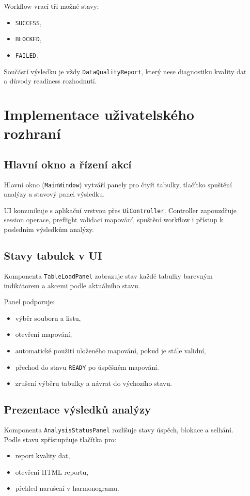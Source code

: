 \documentclass[czech, kiv, ba, he, iso690alph, pdf]{fasthesis}
\begin{document}
			Workflow vrací tři možné stavy:
			\begin{itemize}
				\item \texttt{SUCCESS},
				\item \texttt{BLOCKED},
				\item \texttt{FAILED}.
			\end{itemize}
	
			Součástí výsledku je vždy \texttt{DataQualityReport}, který nese diagnostiku kvality dat a důvody readiness rozhodnutí.
	
		\section{Implementace uživatelského rozhraní}
	
			\subsection{Hlavní okno a řízení akcí}
				Hlavní okno (\texttt{MainWindow}) vytváří panely pro čtyři tabulky, tlačítko spuštění analýzy a stavový panel výsledku.
	
				UI komunikuje s aplikační vrstvou přes \texttt{UiController}. Controller zapouzdřuje session operace, preflight validaci mapování, spuštění workflow i přístup k posledním výsledkům analýzy.
	
			\subsection{Stavy tabulek v UI}
				Komponenta \texttt{TableLoadPanel} zobrazuje stav každé tabulky barevným indikátorem a akcemi podle aktuálního stavu.
	
				Panel podporuje:
				\begin{itemize}
					\item výběr souboru a listu,
					\item otevření mapování,
					\item automatické použití uloženého mapování, pokud je stále validní,
					\item přechod do stavu \texttt{READY} po úspěšném mapování.
					\item zrušení výběru tabulky a návrat do výchozího stavu.
			\end{itemize}
	
			\subsection{Prezentace výsledků analýzy}
				Komponenta \texttt{AnalysisStatusPanel} rozlišuje stavy úspěch, blokace a selhání. Podle stavu zpřístupňuje tlačítka pro:
				\begin{itemize}
					\item report kvality dat,
					\item otevření HTML reportu,
					\item přehled narušení v harmonogramu.
				\end{itemize}
	
\end{document}
